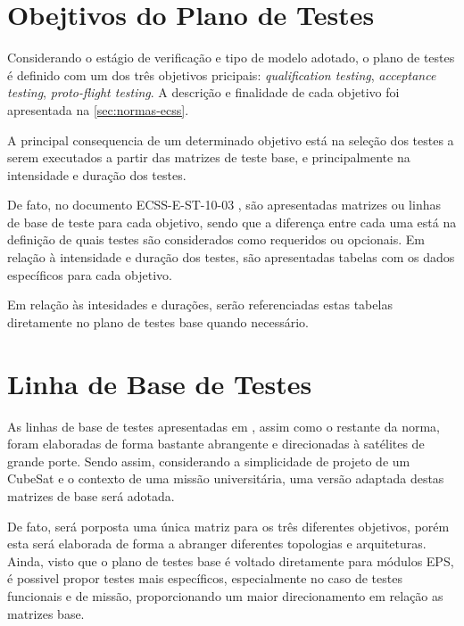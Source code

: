 \section{Obejtivos do Plano de Testes} \label{sec:objetivo-testes}


Considerando o estágio de verificação e tipo de modelo adotado, o plano de testes é definido com um dos três objetivos pricipais: \textit{qualification testing}, \textit{acceptance testing}, \textit{proto-flight testing}.
A descrição e finalidade de cada objetivo foi apresentada na \autoref{sec:normas-ecss}.

A principal consequencia de um determinado objetivo está na seleção dos testes a serem executados a partir das matrizes de teste base, e principalmente na intensidade e duração dos testes.

De fato, no documento ECSS-E-ST-10-03 \cite{ecss-e-st-10-03}, são apresentadas matrizes ou linhas de base de teste para cada objetivo, sendo que a diferença entre cada uma está na definição de quais testes são considerados como requeridos ou opcionais.
Em relação à intensidade e duração dos testes, são apresentadas tabelas com os dados específicos para cada objetivo.

Em relação às intesidades e durações, serão referenciadas estas tabelas diretamente no plano de testes base quando necessário.






\section{Linha de Base de Testes} \label{sec:linhas-base}

As linhas de base de testes apresentadas em \textcite{ecss-e-st-10-03}, assim como o restante da norma, foram elaboradas de forma bastante abrangente e direcionadas à satélites de grande porte.
Sendo assim, considerando a simplicidade de projeto de um CubeSat e o contexto de uma missão universitária, uma versão adaptada destas matrizes de base será adotada.

De fato, será porposta uma única matriz para os três diferentes objetivos, porém esta será elaborada de forma a abranger diferentes topologias e arquiteturas.
Ainda, visto que o plano de testes base é voltado diretamente para módulos \gls{EPS}, é possivel propor testes mais específicos, especialmente no caso de testes funcionais e de missão, proporcionando um maior direcionamento em relação as matrizes base.


